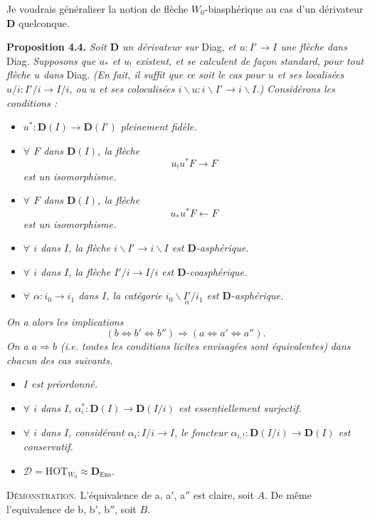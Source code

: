 \documentclass[11pt]{article}
\newcommand{\printedpage}[1]{\marginpar{\footnotesize p.~#1}}
\def\dcprintedpending{}
\newcommand{\msp}[1]{\marginpar{\footnotesize\raggedright
  \ifx\dcprintedpending\empty\else p.~\dcprintedpending\par\fi
  [#1]}\gdef\dcprintedpending{}}
\newcommand{\bD}{\mathbf{D}}
\begin{document}
\printedpage{37}
\msp{page 60}Je voudrais généraliser la notion de flèche $W_0$-biasphérique au cas d'un dérivateur $\bD$ quelconque.

\textbf{Proposition 4.4.} \textit{Soit $\bD$ un dérivateur sur} Diag, \textit{et $u : I' \longrightarrow I$ une flèche dans} Diag. \textit{Supposons que $u_*$ et $u_!$ existent, et se calculent de façon standard, pour tout flèche $u$ dans} Diag. \textit{(En fait, il suffit que ce soit le cas pour $u$ et ses localisées $u/i : I'/i \longrightarrow I/i$, ou $u$ et ses colocalisées $i\backslash u : i\backslash I' \longrightarrow i\backslash I$.) Considérons les conditions :} %
\begin{itemize}[leftmargin=4em]
\item[\textit{a)}] $u^* : \bD(I) \longrightarrow \bD(I')$ \textit{pleinement fidèle.}
\item[\textit{a$'$)}] \textit{$\forall$ $F$ dans $\bD(I)$, la flèche}
\[
u_!u^*F \longrightarrow F
\]
\textit{est un isomorphisme.}
\item[\textit{a$''$)}] \textit{$\forall$ $F$ dans $\bD(I)$, la flèche}
\[
u_*u^*F \longleftarrow F
\]
\textit{est un isomorphisme.}
\item[\textit{b)}] \textit{$\forall$ $i$ dans $I$, la flèche $i\backslash I' \longrightarrow i\backslash I$ est $\bD$-asphérique.}
\item[\textit{b$'$)}] \textit{$\forall$ $i$ dans $I$, la flèche $I'/i \longrightarrow I/i$ est $\bD$-coasphérique.}
\item[\textit{b$''$)}] \textit{$\forall$ $\alpha : i_0 \longrightarrow i_1$ dans $I$, la catégorie $i_0\backslash\underset{\alpha}{I'}/i_1$ est $\bD$-asphérique.}
\end{itemize}
\textit{On a alors les implications}
\[
(b \Longleftrightarrow b' \Longleftrightarrow b'') \Longrightarrow (a \Longleftrightarrow a' \Longleftrightarrow a'').
\]
\textit{On a $a \Longrightarrow b$ (i.e. toutes les conditions licites envisagées sont équivalentes)} \msp{page 61}\textit{dans chacun des cas suivants.}
\begin{itemize}[leftmargin=4em]
\item[$1^o$] \textit{$I$ est préordonné.}
\item[$2^o$] \textit{$\forall$ $i$ dans $I$, $\alpha_i^* : \bD(I) \longrightarrow \bD(I/i)$ est essentiellement surjectif.}
\item[$3^o$] \textit{$\forall$ $i$ dans $I$, considérant $\alpha_i : I/i \longrightarrow I$, le foncteur $\alpha_{i,!} : \bD(I/i) \longrightarrow \bD(I)$ est conservatif.}
\item[$4^o$] $\mathcal{D} = \mathrm{HOT}_{W_0} \approx \bD_{\mathrm{Ens}}$.
\end{itemize}
\textsc{Démonstration}. L'équivalence de a, a$'$, a$''$ est claire, soit $A$. De même l'equivalence de b, b$'$, b$''$, soit $B$. %
\end{document}
